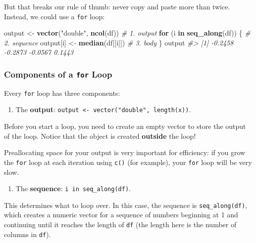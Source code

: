\documentclass[]{book}
\newenvironment{Shaded}{\begin{snugshade}}{\end{snugshade}}
\newcommand{\KeywordTok}[1]{\textcolor[rgb]{0.13,0.29,0.53}{\textbf{#1}}}
\newcommand{\StringTok}[1]{\textcolor[rgb]{0.31,0.60,0.02}{#1}}
\newcommand{\CommentTok}[1]{\textcolor[rgb]{0.56,0.35,0.01}{\textit{#1}}}
\newcommand{\ControlFlowTok}[1]{\textcolor[rgb]{0.13,0.29,0.53}{\textbf{#1}}}
\newcommand{\NormalTok}[1]{#1}
\providecommand{\tightlist}{%
  \setlength{\itemsep}{0pt}\setlength{\parskip}{0pt}}
\begin{document}
But that breaks our rule of thumb: never copy and paste more than twice.
Instead, we could use a \texttt{for} loop:

\begin{Shaded}
\begin{Highlighting}[]
\NormalTok{output <-}\StringTok{ }\KeywordTok{vector}\NormalTok{(}\StringTok{"double"}\NormalTok{, }\KeywordTok{ncol}\NormalTok{(df))  }\CommentTok{# 1. output}
\ControlFlowTok{for}\NormalTok{ (i }\ControlFlowTok{in} \KeywordTok{seq_along}\NormalTok{(df)) \{            }\CommentTok{# 2. sequence}
\NormalTok{  output[i] <-}\StringTok{ }\KeywordTok{median}\NormalTok{(df[[i]])        }\CommentTok{# 3. body}
\NormalTok{\}}
\NormalTok{output}
\CommentTok{#> [1] -0.2458 -0.2873 -0.0567  0.1443}
\end{Highlighting}
\end{Shaded}

\subsubsection*{\texorpdfstring{Components of a \texttt{for}
Loop}{Components of a for Loop}}\label{components-of-a-for-loop}

Every \texttt{for} loop has three components:

\begin{enumerate}
\def\labelenumi{\arabic{enumi}.}
\tightlist
\item
  The \textbf{output}:
  \texttt{output\ \textless{}-\ vector("double",\ length(x))}.
\end{enumerate}

Before you start a loop, you need to create an empty vector to store the
output of the loop. Notice that the object is created \textbf{outside}
the loop!

Preallocating space for your output is very important for efficiency: if
you grow the \texttt{for} loop at each iteration using \texttt{c()} (for
example), your \texttt{for} loop will be very slow.

\begin{enumerate}
\def\labelenumi{\arabic{enumi}.}
\setcounter{enumi}{1}
\tightlist
\item
  The \textbf{sequence}: \texttt{i\ in\ seq\_along(df)}.
\end{enumerate}

This determines what to loop over. In this case, the sequence is
\texttt{seq\_along(df)}, which creates a numeric vector for a sequence
of numbers beginning at 1 and continuing until it reaches the length of
\texttt{df} (the length here is the number of columns in \texttt{df}).
\end{document}
